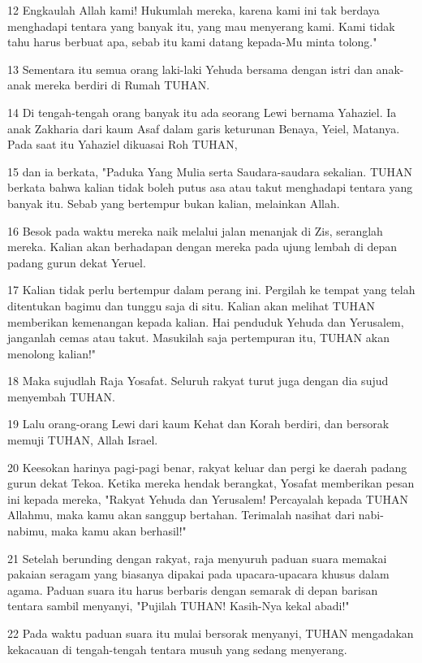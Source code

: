 \par 12 Engkaulah Allah kami! Hukumlah mereka, karena kami ini tak berdaya menghadapi tentara yang banyak itu, yang mau menyerang kami. Kami tidak tahu harus berbuat apa, sebab itu kami datang kepada-Mu minta tolong."
\par 13 Sementara itu semua orang laki-laki Yehuda bersama dengan istri dan anak-anak mereka berdiri di Rumah TUHAN.
\par 14 Di tengah-tengah orang banyak itu ada seorang Lewi bernama Yahaziel. Ia anak Zakharia dari kaum Asaf dalam garis keturunan Benaya, Yeiel, Matanya. Pada saat itu Yahaziel dikuasai Roh TUHAN,
\par 15 dan ia berkata, "Paduka Yang Mulia serta Saudara-saudara sekalian. TUHAN berkata bahwa kalian tidak boleh putus asa atau takut menghadapi tentara yang banyak itu. Sebab yang bertempur bukan kalian, melainkan Allah.
\par 16 Besok pada waktu mereka naik melalui jalan menanjak di Zis, seranglah mereka. Kalian akan berhadapan dengan mereka pada ujung lembah di depan padang gurun dekat Yeruel.
\par 17 Kalian tidak perlu bertempur dalam perang ini. Pergilah ke tempat yang telah ditentukan bagimu dan tunggu saja di situ. Kalian akan melihat TUHAN memberikan kemenangan kepada kalian. Hai penduduk Yehuda dan Yerusalem, janganlah cemas atau takut. Masukilah saja pertempuran itu, TUHAN akan menolong kalian!"
\par 18 Maka sujudlah Raja Yosafat. Seluruh rakyat turut juga dengan dia sujud menyembah TUHAN.
\par 19 Lalu orang-orang Lewi dari kaum Kehat dan Korah berdiri, dan bersorak memuji TUHAN, Allah Israel.
\par 20 Keesokan harinya pagi-pagi benar, rakyat keluar dan pergi ke daerah padang gurun dekat Tekoa. Ketika mereka hendak berangkat, Yosafat memberikan pesan ini kepada mereka, "Rakyat Yehuda dan Yerusalem! Percayalah kepada TUHAN Allahmu, maka kamu akan sanggup bertahan. Terimalah nasihat dari nabi-nabimu, maka kamu akan berhasil!"
\par 21 Setelah berunding dengan rakyat, raja menyuruh paduan suara memakai pakaian seragam yang biasanya dipakai pada upacara-upacara khusus dalam agama. Paduan suara itu harus berbaris dengan semarak di depan barisan tentara sambil menyanyi, "Pujilah TUHAN! Kasih-Nya kekal abadi!"
\par 22 Pada waktu paduan suara itu mulai bersorak menyanyi, TUHAN mengadakan kekacauan di tengah-tengah tentara musuh yang sedang menyerang.
